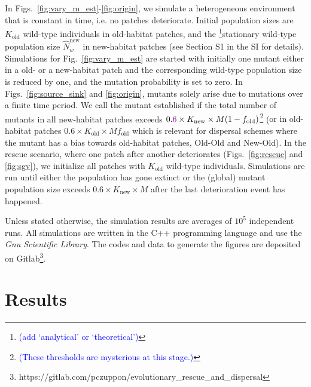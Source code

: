 \documentclass[a4paper,11pt]{article}
\newcommand{\francois}[1]{\textcolor{blue}{(#1)}}
\newcommand{\chg}[1]{\textcolor{change}{#1}}
\begin{document}
In Figs.~\ref{fig:vary_m_est}-\ref{fig:origin}, we simulate a heterogeneous environment that is constant in time, i.e. no patches deteriorate. Initial population sizes are $K_{\text{old}}$ wild-type individuals in old-habitat patches, and the \footnote{\francois{add `analytical' or `theoretical'}}stationary wild-type population size $\widehat{N}_w^{\text{new}}$ in new-habitat patches (see Section S1 in the SI for details). \chg{Simulations for} Fig.~\ref{fig:vary_m_est} are started with initially one mutant either in a old- or a new-habitat patch and the corresponding wild-type population size is reduced by one, \chg{and} the mutation probability is set to zero. In \chg{Figs.~\ref{fig:source_sink} and \ref{fig:origin}}, mutants solely arise due to mutations \chg{over a finite time period}. 
We \chg{call the mutant established if} the total number of mutants in all new-habitat patches exceeds $0.\chg{6} \times K_{\text{new}} \times M(1- f_{\text{old}})$\footnote{\francois{These thresholds are mysterious at this stage.}} (\chg{or in old-habitat patches $0.6\times K_{\text{old}}\times M f_{\text{old}}$ which is relevant for dispersal schemes where the mutant has a bias towards old-habitat patches, Old-Old and New-Old}).
In the rescue scenario, where one patch after \chg{another} deteriorates (Figs.~\ref{fig:rescue} and \ref{fig:sgv}), we initialize all patches with $K_{\text{old}}$ wild-type individuals. Simulations are run until either the population has gone extinct or the (global) mutant population size exceeds $0.6\times K_{\text{new}}\times M$ after the last deterioration event has happened. 

Unless stated otherwise, the simulation results are averages of $10^5$ independent runs. All simulations are written in the C++ programming language and use the \textit{Gnu Scientific Library}. The codes and data to generate the figures are deposited on Gitlab\footnote{https://gitlab.com/pczuppon/evolutionary\_rescue\_and\_dispersal}.

\section*{Results}
\end{document}
